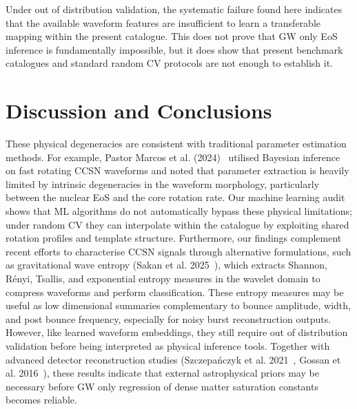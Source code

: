 \documentclass[reprint,aps,prd,floatfix,nofootinbib,superscriptaddress,showpacs]{revtex4-2}
\begin{document}
Under out of distribution validation, the systematic failure found here indicates that the available waveform features are insufficient to learn a transferable mapping within the present catalogue. This does not prove that GW only EoS inference is fundamentally impossible, but it does show that present benchmark catalogues and standard random CV protocols are not enough to establish it.

\section{Discussion and Conclusions}
These physical degeneracies are consistent with traditional parameter estimation methods. For example, Pastor Marcos et al. (2024)~\cite{pastormarcos2024} utilised Bayesian inference on fast rotating CCSN waveforms and noted that parameter extraction is heavily limited by intrinsic degeneracies in the waveform morphology, particularly between the nuclear EoS and the core rotation rate. Our machine learning audit shows that ML algorithms do not automatically bypass these physical limitations; under random CV they can interpolate within the catalogue by exploiting shared rotation profiles and template structure. Furthermore, our findings complement recent efforts to characterise CCSN signals through alternative formulations, such as gravitational wave entropy (Sakan et al. 2025~\cite{sakan2025}), which extracts Shannon, Rényi, Tsallis, and exponential entropy measures in the wavelet domain to compress waveforms and perform classification. These entropy measures may be useful as low dimensional summaries complementary to bounce amplitude, width, and post bounce frequency, especially for noisy burst reconstruction outputs. However, like learned waveform embeddings, they still require out of distribution validation before being interpreted as physical inference tools. Together with advanced detector reconstruction studies (Szczepa\'nczyk et al. 2021~\cite{szczepanczyk2021}, Gossan et al. 2016~\cite{gossan2016}), these results indicate that external astrophysical priors may be necessary before GW only regression of dense matter saturation constants becomes reliable.
\end{document}
